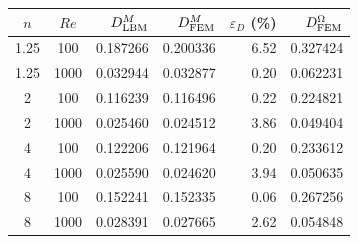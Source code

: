 \begin{tabular}{@{}ccrrrr@{}}
\toprule
$n$ & $Re$ & $D_{\rm LBM}^{M}$ & $D_{\rm FEM}^{M}$ & $\varepsilon_D$ (\%) & $D_{\rm FEM}^{\Omega}$ \\
\midrule
1.25 & 100 & 0.187266 & 0.200336 & 6.52 & 0.327424 \\
1.25 & 1000 & 0.032944 & 0.032877 & 0.20 & 0.062231 \\
2 & 100 & 0.116239 & 0.116496 & 0.22 & 0.224821 \\
2 & 1000 & 0.025460 & 0.024512 & 3.86 & 0.049404 \\
4 & 100 & 0.122206 & 0.121964 & 0.20 & 0.233612 \\
4 & 1000 & 0.025590 & 0.024620 & 3.94 & 0.050635 \\
8 & 100 & 0.152241 & 0.152335 & 0.06 & 0.267256 \\
8 & 1000 & 0.028391 & 0.027665 & 2.62 & 0.054848 \\
\bottomrule
\end{tabular}
